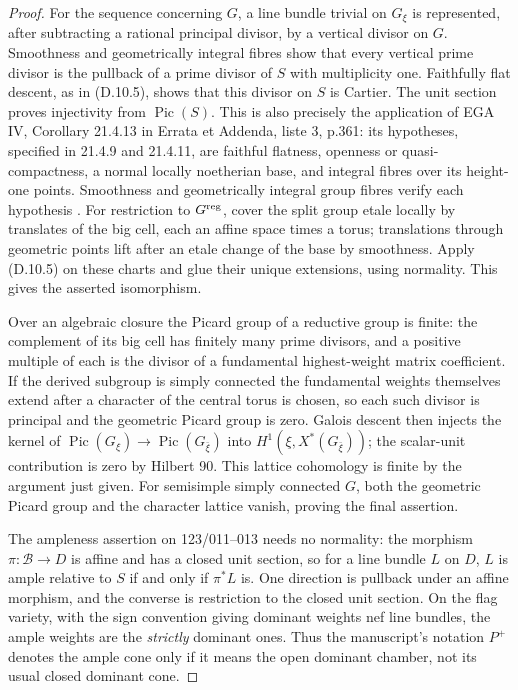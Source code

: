 \begin{proof}
For the sequence concerning $G$, a line bundle trivial on $G_\xi$
is represented, after subtracting a rational principal divisor, by
a vertical divisor on $G$.  Smoothness and geometrically integral
fibres show that every vertical prime divisor is the pullback of
a prime divisor of $S$ with multiplicity one.  Faithfully flat
descent, as in (D.10.5), shows that this divisor on $S$ is Cartier.
The unit section proves injectivity from $\operatorname{Pic}(S)$.
This is also precisely the application of EGA IV, Corollary
21.4.13 in Errata et Addenda, liste 3, p.361: its hypotheses,
specified in 21.4.9 and 21.4.11, are faithful flatness, openness
or quasi-compactness, a normal locally noetherian base, and
integral fibres over its height-one points.  Smoothness and
geometrically integral group fibres verify each hypothesis
\cite[pp.358--361]{D-EGAIV4}.
For restriction to $G^{\rm reg}$, cover the split group etale locally
by translates of the big cell, each an affine space times a torus;
translations through geometric points lift after an etale change
of the base by smoothness.  Apply (D.10.5) on these charts and glue
their unique extensions, using normality.  This gives the asserted
isomorphism.

Over an algebraic closure the Picard group of a reductive group is
finite: the complement of its big cell has finitely many prime
divisors, and a positive multiple of each is the divisor of a
fundamental highest-weight matrix coefficient.  If the derived
subgroup is simply connected the fundamental weights themselves
extend after a character of the central torus is chosen, so each
such divisor is principal and the geometric Picard group is zero.
Galois descent then injects the kernel of
$\operatorname{Pic}(G_\xi)\to\operatorname{Pic}(G_{\bar\xi})$
into $H^1(\xi,X^*(G_{\bar\xi}))$; the scalar-unit contribution is
zero by Hilbert 90.  This lattice cohomology is finite by the
argument just given.  For semisimple simply connected $G$, both
the geometric Picard group and the character lattice vanish,
proving the final assertion.

The ampleness assertion on 123/011--013 needs no normality:
the morphism $\pi:\mathcal B\to D$ is affine and has a closed
unit section, so for a line bundle $L$ on $D$, $L$ is ample
relative to $S$ if and only if $\pi^*L$ is.  One direction is
pullback under an affine morphism, and the converse is
restriction to the closed unit section.  On the flag variety,
with the sign convention giving dominant weights nef line
bundles, the ample weights are the \emph{strictly} dominant
ones.  Thus the manuscript's notation $P^+$ denotes the ample
cone only if it means the open dominant chamber, not its usual
closed dominant cone.
\end{proof}

